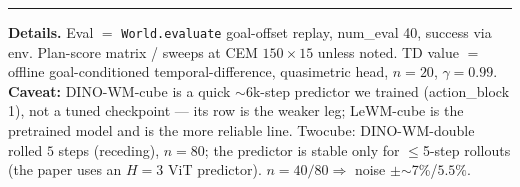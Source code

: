 \documentclass[11pt]{article}
\begin{document}
\vspace{0.6em}\hrule\vspace{0.3em}
{\footnotesize\color{gray}
\textbf{Details.} Eval $=$ \texttt{World.evaluate} goal-offset replay, num\_eval 40, success via env. Plan-score
matrix / sweeps at CEM $150\times15$ unless noted. TD value $=$ offline goal-conditioned temporal-difference,
quasimetric head, $n{=}20$, $\gamma{=}0.99$. \textbf{Caveat:} \textsf{DINO-WM-cube} is a quick $\sim$6k-step
predictor we trained (action\_block 1), not a tuned checkpoint --- its row is the weaker leg; \textsf{LeWM-cube}
is the pretrained model and is the more reliable line. Twocube: \textsf{DINO-WM-double} rolled $5$ steps
(receding), $n{=}80$; the predictor is stable only for $\le$5-step rollouts (the paper uses an $H{=}3$ ViT
predictor). $n{=}40/80 \Rightarrow$ noise $\pm$$\sim$7\%/$5.5\%$.}
\end{document}
